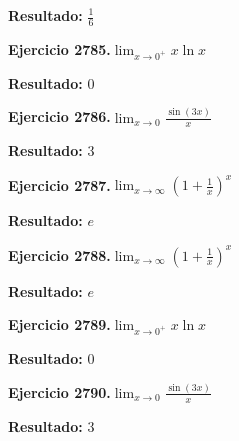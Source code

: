 \documentclass[10pt,a4paper]{article}
\begin{document}
\begin{solbox}
\textbf{Resultado:} \(\displaystyle \frac{1}{6}\)
\end{solbox}

\begin{ejbox}
\textbf{Ejercicio 2785.}\quad $\lim_{x\to 0^+} x\ln x$
\end{ejbox}

\begin{solbox}
\textbf{Resultado:} \(\displaystyle 0\)
\end{solbox}

\begin{ejbox}
\textbf{Ejercicio 2786.}\quad $\lim_{x\to 0} \frac{\sin(3x)}{x}$
\end{ejbox}

\begin{solbox}
\textbf{Resultado:} \(\displaystyle 3\)
\end{solbox}

\newpage
\begin{ejbox}
\textbf{Ejercicio 2787.}\quad $\lim_{x\to \infty} \left(1+\frac{1}{x}\right)^x$
\end{ejbox}

\begin{solbox}
\textbf{Resultado:} \(\displaystyle e\)
\end{solbox}

\begin{ejbox}
\textbf{Ejercicio 2788.}\quad $\lim_{x\to \infty} \left(1+\frac{1}{x}\right)^x$
\end{ejbox}

\begin{solbox}
\textbf{Resultado:} \(\displaystyle e\)
\end{solbox}

\begin{ejbox}
\textbf{Ejercicio 2789.}\quad $\lim_{x\to 0^+} x\ln x$
\end{ejbox}

\begin{solbox}
\textbf{Resultado:} \(\displaystyle 0\)
\end{solbox}

\newpage
\begin{ejbox}
\textbf{Ejercicio 2790.}\quad $\lim_{x\to 0} \frac{\sin(3x)}{x}$
\end{ejbox}

\begin{solbox}
\textbf{Resultado:} \(\displaystyle 3\)
\end{solbox}
\end{document}
